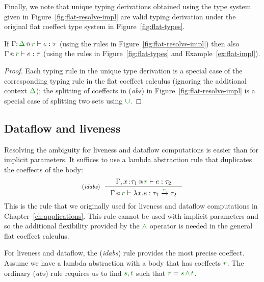 \noindent
Finally, we note that unique typing derivations obtained using the type system given in
Figure~\ref{fig:flat-resolve-impl} are valid typing derivation under the original flat coeffect
type system in Figure~\ref{fig:flat-types}.

\begin{theorem}
\label{thm:flat-impl-admis}
  If $\coctx{\Gamma;\cclrd{\Delta}}{\cclrd{r}} \vdash e : \tau$ (using the rules in
  Figure~\ref{fig:flat-resolve-impl}) then also $\coctx{\Gamma}{\cclrd{r}} \vdash e : \tau$
  (using the rules in Figure~\ref{fig:flat-types} and Example~\ref{ex:flat-impl}).
\end{theorem}
\begin{proof}
  Each typing rule in the unique type derivation is a special case of the corresponding
  typing rule in the flat coeffect calculus (ignoring the additional context $\cclrd{\Delta}$); the
  splitting of coeffects in (\emph{abs}) in Figure~\ref{fig:flat-resolve-impl} is a special case
  of splitting two sets using $\cclrd{\cup}$.
\end{proof}


\subsection{Dataflow and liveness}
\label{sec:flat-unique-ldf}

Resolving the ambiguity for liveness and dataflow computations is easier than for implicit
parameters. It suffices to use a lambda abstraction rule that duplicates the coeffects of the
body:
%
\begin{equation*}
\tyrule{idabs}
  {\coctx{\Gamma, x\!:\!\tau_1}{\cclrd{r}} \vdash e : \tau_2}
  {\coctx{\Gamma}{\cclrd{r}} \vdash \lambda x.e : \tau_1 \xrightarrow{\cclrd{r}} \tau_2 }
\end{equation*}
%
This is the rule that we originally used for liveness and dataflow computations in
Chapter~\ref{ch:applications}. This rule cannot be used with implicit parameters and so
the additional flexibility provided by the $\czip$ operator is needed in the general flat
coeffect calculus.

For liveness and dataflow, the (\emph{idabs}) rule provides the most precise coeffect.
Assume we have a lambda abstraction with a body that has coeffects $\cclrd{r}$. The
ordinary (\emph{abs}) rule requires us to find $\cclrd{s}, \cclrd{t}$ such that
$\cclrd{r}=\cclrd{s}\,\czip\,\cclrd{t}$.

